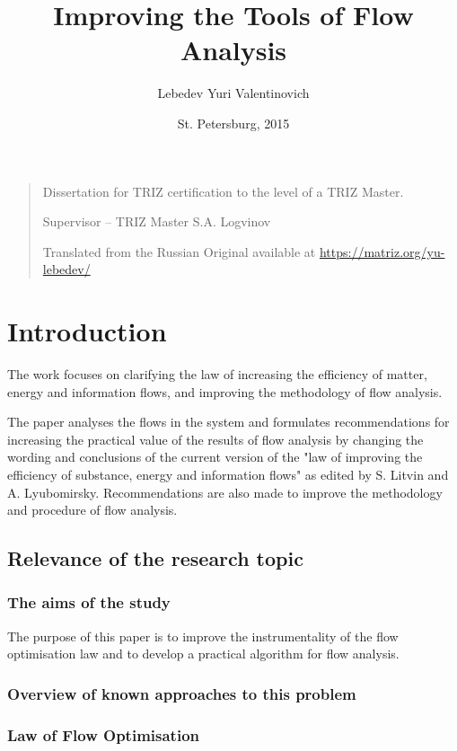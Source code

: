 \documentclass[a4paper,11pt]{article}
\author{Lebedev Yuri Valentinovich}
\title{Improving the Tools of Flow Analysis}
\date{St. Petersburg, 2015}
\begin{document}
\maketitle

\begin{quote}
  Dissertation for TRIZ certification to the level of a TRIZ Master.

  Supervisor -- TRIZ Master S.A. Logvinov

  Translated from the Russian Original available at
  \url{https://matriz.org/yu-lebedev/} 
\end{quote}

\section{Introduction}

The work focuses on clarifying the law of increasing the efficiency of matter,
energy and information flows, and improving the methodology of flow analysis.

The paper analyses the flows in the system and formulates recommendations for
increasing the practical value of the results of flow analysis by changing the
wording and conclusions of the current version of the "law of improving the
efficiency of substance, energy and information flows" as edited by S. Litvin
and A. Lyubomirsky. Recommendations are also made to improve the methodology
and procedure of flow analysis.

\subsection{Relevance of the research topic}

\subsubsection{The aims of the study}

The purpose of this paper is to improve the instrumentality of the flow
optimisation law and to develop a practical algorithm for flow analysis.

\subsubsection{Overview of known approaches to this problem}

\subsubsection*{Law of Flow Optimisation} 
\end{document}
